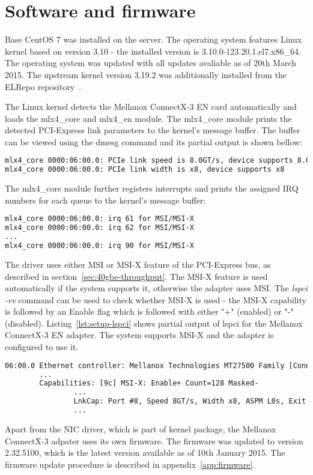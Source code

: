 
\section{Software and firmware}
Base CentOS 7 was installed on the server.
The operating system features Linux kernel based on version 3.10 -
the installed version is 3.10.0-123.20.1.el7.x86\_64.
The operating system was updated with all updates avaliable as of 20th March 2015.
The upstream kernel version 3.19.2 was additionally installed from the ELRepo repository~\cite{elrepo-kernel-ml}.

The Linux kernel detects the Mellanox ConnectX-3 EN card automatically and loads the mlx4\_core and mlx4\_en module.
The mlx4\_core module prints the detected PCI-Express link parameters to the kernel's message buffer.
The buffer can be viewed using the dmesg command and its partial output is shown bellow:
\begin{lstlisting}[language=TeX]
mlx4_core 0000:06:00.0: PCIe link speed is 8.0GT/s, device supports 8.0GT/s
mlx4_core 0000:06:00.0: PCIe link width is x8, device supports x8
\end{lstlisting}
The mlx4\_core module further registers interrupts and prints the assigned IRQ numbers for each queue
to the kernel's message buffer:
\begin{lstlisting}[language=TeX]
mlx4_core 0000:06:00.0: irq 61 for MSI/MSI-X
mlx4_core 0000:06:00.0: irq 62 for MSI/MSI-X
...
mlx4_core 0000:06:00.0: irq 90 for MSI/MSI-X
\end{lstlisting}

The driver uses either MSI or MSI-X feature of the PCI-Express bus, as described in section~\ref{sec:40gbe-throughput}.
The MSI-X feature is used automatically if the system supports it, otherwise the adapter uses MSI.
The {\it{lspci -vv}} command can be used to check whether MSI-X is used -
the MSI-X capability is followed by an Enable flag which is followed with either "+" (enabled)
or "-" (disabled).
Listing~\ref{lst:setup-lspci} shows partial output of lspci for the Mellanox ConnectX-3 EN adapter.
The system supports MSI-X and the adapter is configured to use it.
\begin{lstlisting}[language=TeX,label={lst:setup-lspci},caption={Partial output of lspci -vv for Mellanox ConnectX-3 EN}]
06:00.0 Ethernet controller: Mellanox Technologies MT27500 Family [ConnectX-3]
		...
		Capabilities: [9c] MSI-X: Enable+ Count=128 Masked-
				...
				LnkCap: Port #8, Speed 8GT/s, Width x8, ASPM L0s, Exit Latency L0s unlimited, L1 unlimited
				...
\end{lstlisting}

Apart from the NIC driver, which is part of kernel package, the Mellanox ConnectX-3 adpater uses its own firmware.
The firmware was updated to version 2.32.5100, which is the latest version available as of 10th January 2015.
The firmware update procedure is described in appendix~\ref{app:firmware}.

